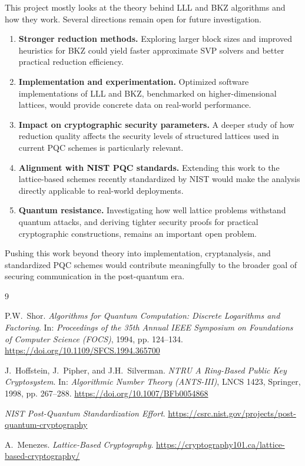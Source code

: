 \documentclass[12pt, a4paper]{article}
\theoremstyle{definition}
\theoremstyle{plain}
\begin{document}
This project mostly looks at the theory behind LLL and BKZ algorithms and how they work. Several directions remain open for future investigation.

\begin{enumerate}
    \item \textbf{Stronger reduction methods.} Exploring larger block sizes and
          improved heuristics for BKZ could yield faster approximate SVP solvers
          and better practical reduction efficiency.

    \item \textbf{Implementation and experimentation.} Optimized software
          implementations of LLL and BKZ, benchmarked on higher-dimensional
          lattices, would provide concrete data on real-world performance.

    \item \textbf{Impact on cryptographic security parameters.} A deeper study of
          how reduction quality affects the security levels of structured lattices
          used in current PQC schemes is particularly relevant.

    \item \textbf{Alignment with NIST PQC standards.} Extending this work to the
          lattice-based schemes recently standardized by NIST would make the
          analysis directly applicable to real-world deployments.

    \item \textbf{Quantum resistance.} Investigating how well lattice problems
          withstand quantum attacks, and deriving tighter security proofs for
          practical cryptographic constructions, remains an important open problem.
\end{enumerate}

Pushing this work beyond theory into implementation, cryptanalysis, and standardized
PQC schemes would contribute meaningfully to the broader goal of securing
communication in the post-quantum era.

\begin{thebibliography}{9}

    P.W.~Shor. 
    \textit{Algorithms for Quantum Computation: Discrete Logarithms and Factoring}. 
    In: \textit{Proceedings of the 35th Annual IEEE Symposium on Foundations of Computer Science (FOCS)}, 1994, pp. 124--134. 
    \url{https://doi.org/10.1109/SFCS.1994.365700}

    J.~Hoffstein, J.~Pipher, and J.H.~Silverman. 
    \textit{NTRU\: A Ring-Based Public Key Cryptosystem}. 
    In: \textit{Algorithmic Number Theory (ANTS-III)}, LNCS 1423, Springer, 1998, pp. 267--288. 
    \url{https://doi.org/10.1007/BFb0054868}

    \textit{NIST Post-Quantum Standardization Effort}.
    \url{https://csrc.nist.gov/projects/post-quantum-cryptography}

    A.~Menezes.
    \textit{Lattice-Based Cryptography}.
    \url{https://cryptography101.ca/lattice-based-cryptography/}

\end{thebibliography}
\end{document}
